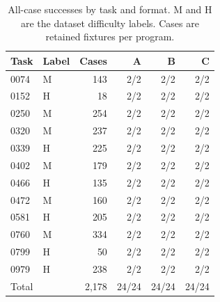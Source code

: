 \begin{table}[t]
\caption{All-case successes by task and format. M and H are the dataset difficulty labels. Cases are retained fixtures per program.}
\label{tab:results}
\centering
\small
\begin{tabular}{@{}llrrrr@{}}
\toprule
Task & Label & Cases & A & B & C\\
\midrule
0074 & M & 143 & 2/2 & 2/2 & 2/2\\
0152 & H & 18 & 2/2 & 2/2 & 2/2\\
0250 & M & 254 & 2/2 & 2/2 & 2/2\\
0320 & M & 237 & 2/2 & 2/2 & 2/2\\
0339 & H & 225 & 2/2 & 2/2 & 2/2\\
0402 & M & 179 & 2/2 & 2/2 & 2/2\\
0466 & H & 135 & 2/2 & 2/2 & 2/2\\
0472 & M & 160 & 2/2 & 2/2 & 2/2\\
0581 & H & 205 & 2/2 & 2/2 & 2/2\\
0760 & M & 334 & 2/2 & 2/2 & 2/2\\
0799 & H & 50 & 2/2 & 2/2 & 2/2\\
0979 & H & 238 & 2/2 & 2/2 & 2/2\\
\midrule
Total & & 2,178 & 24/24 & 24/24 & 24/24\\
\bottomrule
\end{tabular}
\end{table}
